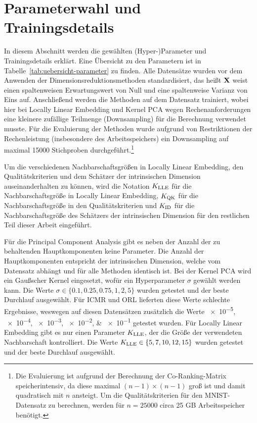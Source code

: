 \section{Parameterwahl und Trainingsdetails}
\label{ch:Vergleich:sec:ParameterwahlTrainingsdetails}

In diesem Abschnitt werden die gewählten (Hyper-)Parameter und Trainingsdetails erklärt. Eine
Übersicht zu den Parametern ist in Tabelle~\ref{tab:uebersicht-parameter} zu finden. Alle
Datensätze wurden vor dem Anwenden der Dimensionsreduktionsmethoden standardisiert, das heißt
$\mathbf{X}$ weist einen spaltenweisen Erwartungswert von Null und eine spaltenweise Varianz von Eins
auf. Anschließend werden die Methoden auf dem Datensatz trainiert, wobei hier bei Locally Linear
Embedding und Kernel PCA wegen Rechenanforderungen eine kleinere zufällige Teilmenge (Downsampling)
für die Berechnung verwendet musste. Für die Evaluierung der Methoden wurde aufgrund von
Restriktionen der Rechenleistung (insbesondere des Arbeitsspeichers) ein Downsampling auf maximal
\num{15000} Stichproben durchgeführt.\footnote{Die Evaluierung ist aufgrund der Berechnung der
	Co-Ranking-Matrix speicherintensiv, da diese maximal $(n-1) \times (n-1)$ groß ist und damit
	quadratisch mit $n$ ansteigt. Um die Qualitätskriterien für den MNIST-Datensatz zu berechnen,
	werden für $n=\num{25000}$ circa 25 GB Arbeitsspeicher benötigt.}

Um die verschiedenen Nachbarschaftsgrößen in Locally Linear Embedding, den Qualitätskriterien und
dem Schätzer der intrinsischen Dimension auseinanderhalten zu können, wird die Notation $K_{\text{LLE}}$ für
die Nachbarschaftsgröße in Locally Linear Embedding, $K_{\text{QK}}$ für die Nachbarschaftsgröße in den
Qualitätskriterien und $K_{\text{ID}}$ für die Nachbarschaftsgröße des Schätzers der intrinsischen Dimension
für den restlichen Teil dieser Arbeit eingeführt.

Für die Principal Component Analysis gibt es neben der Anzahl der zu behaltenden Hauptkomponenten
keine Parameter. Die Anzahl der Hauptkomponenten entspricht der intrinsischen Dimension, welche vom
Datensatz abhängt und für alle Methoden identisch ist. Bei der Kernel PCA wird ein Gaußscher Kernel
eingesetzt, wofür ein Hyperparameter $\sigma$ gewählt werden kann. Die Werte $\sigma \in \{ 0.1,
	0.25, 0.75, 1, 2, 5\}$ wurden getestet und der beste Durchlauf ausgewählt. Für ICMR und ORL
lieferten diese Werte schlechte Ergebnisse, weswegen auf diesen Datensätzen zusätzlich die Werte
\numlist{e-5;e-4;e-3;e-2;e-1} getestet wurden. Für Locally Linear Embedding gibt es nur einen
Parameter $K_{\text{LLE}}$, der die Größe der verwendeten Nachbarschaft kontrolliert. Die Werte $K_{\text{LLE}} \in
	\{ 5, 7, 10, 12, 15\}$ wurden getestet und der beste Durchlauf ausgewählt.

